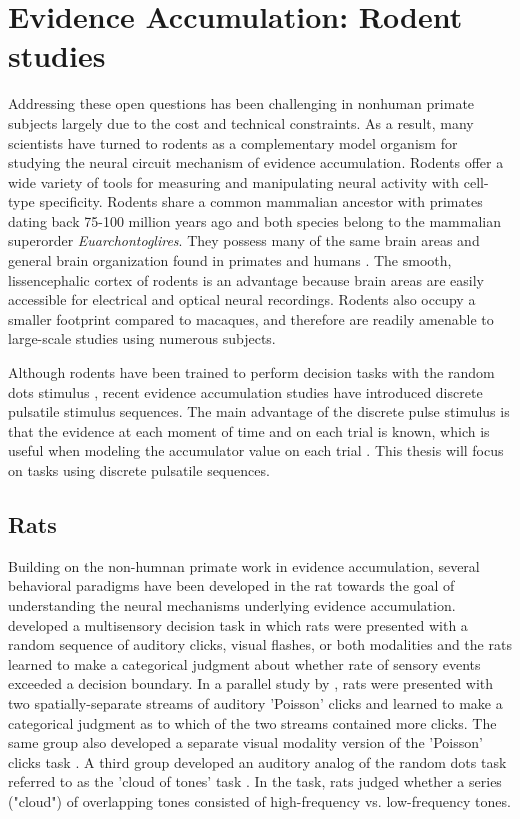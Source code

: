 \section{Evidence Accumulation: Rodent studies}
Addressing these open questions has been challenging in nonhuman primate subjects largely due to the cost and technical constraints. As a result, many scientists have turned to rodents as a complementary model organism for studying the neural circuit mechanism of evidence accumulation. Rodents offer a wide variety of tools for measuring and manipulating neural activity with cell-type specificity. Rodents share a common mammalian ancestor with primates dating back 75-100 million years ago \parencite{Murphy2004} and both species belong to the mammalian superorder \emph{Euarchontoglires}. They possess many of the same brain areas and general brain organization found in primates and humans \parencite{Kaas2009}. The smooth, lissencephalic cortex of rodents is an advantage because brain areas are easily accessible for electrical and optical neural recordings. Rodents also occupy a smaller footprint compared to macaques, and therefore are readily amenable to large-scale studies using numerous subjects. \par 

Although rodents have been trained to perform decision tasks with the random dots stimulus \parencite{Douglas2006,Reinagel2013,Petruno2013,Stirman2016}, recent evidence accumulation studies have introduced discrete pulsatile stimulus sequences. The main advantage of the discrete pulse stimulus is that the evidence at each moment of time and on each trial is known, which is useful when modeling the accumulator value on each trial \parencite{Brunton2013,Hanks2015}. This thesis will focus on tasks using discrete pulsatile sequences.

\subsection{Rats}
Building on the non-humnan primate work in evidence accumulation, several behavioral paradigms have been developed in the rat towards the goal of understanding the neural mechanisms underlying evidence accumulation. \textcite{Raposo2012a} developed a multisensory decision task in which rats were presented with a random sequence of auditory clicks, visual flashes, or both modalities and the rats learned to make a categorical judgment about whether rate of sensory events exceeded a decision boundary. In a parallel study by \textcite{Brunton2013}, rats were presented with two spatially-separate streams of auditory 'Poisson' clicks and learned to make a categorical judgment as to which of the two streams contained more clicks. The same group also developed a separate visual modality version of the 'Poisson' clicks task \parencite{Scott2015SourcesRats}. A third group developed an auditory analog of the random dots task referred to as the 'cloud of tones' task \parencite{Znamenskiy2013b}. In the task, rats judged whether a series ("cloud") of overlapping tones consisted of high-frequency vs. low-frequency tones. \par 

